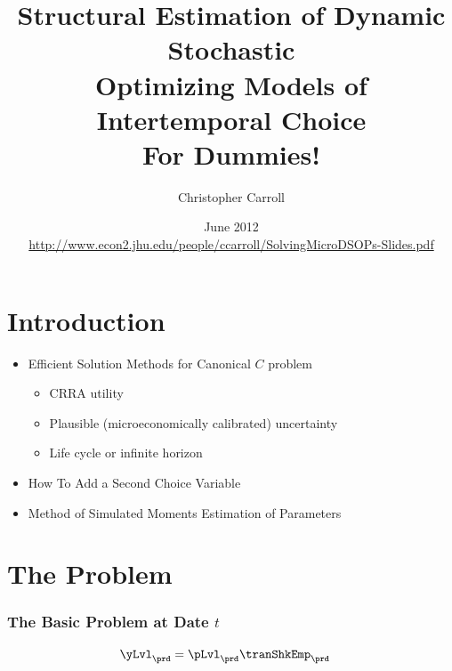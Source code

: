 \documentclass{beamer}
\begin{document}
\title[SolvingMicroDSOPs]{\textbf{Structural Estimation of Dynamic Stochastic\\ Optimizing Models of Intertemporal Choice \\ \LARGE{For Dummies!}}}
\author[Carroll]{Christopher Carroll}

\date{June 2012 \\ {\tiny \url{http://www.econ2.jhu.edu/people/ccarroll/SolvingMicroDSOPs-Slides.pdf}}
}


\begin{frame}[plain]
  \titlepage
\end{frame}


\section{Introduction}

\begin{frame}
\begin{itemize}
\item Efficient Solution Methods for Canonical $C$ problem
\begin{itemize}
\item CRRA utility
\item Plausible (microeconomically calibrated) uncertainty
\item Life cycle or infinite horizon
\end{itemize}
\item How To Add a Second Choice Variable
\item Method of Simulated Moments Estimation of Parameters
\end{itemize}
\end{frame}

\section{The Problem}

\begin{frame}[label=MaxProb]
\frametitle{\large\textbf{The Basic Problem at Date $t$}}


\begin{equation}\begin{gathered}\begin{aligned}
{\yLvl}_{\prd}  & = {\pLvl}_{\prd}\tranShkEmp_{\prd}
\end{aligned}\end{gathered}\end{equation}

\end{frame}
\end{document}
